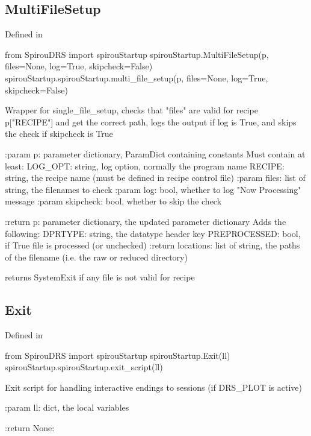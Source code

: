 \noindent\begin{minipage}{\textwidth}
\subsection{MultiFileSetup}

Defined in \spirouStartup{}

\begin{pythonbox}
from SpirouDRS import spirouStartup
spirouStartup.MultiFileSetup(p, files=None, log=True, skipcheck=False)
spirouStartup.spirouStartup.multi_file_setup(p, files=None, log=True, skipcheck=False)
\end{pythonbox}

\begin{pythondocstring}
Wrapper for single_file_setup, checks that "files" are valid for recipe 
p["RECIPE"] and get the correct path, logs the output if log is True, 
and skips the check if skipcheck is True

:param p: parameter dictionary, ParamDict containing constants
    Must contain at least:
        LOG_OPT: string, log option, normally the program name
        RECIPE: string, the recipe name (must be defined in recipe control
                file)
:param files: list of string, the filenames to check
:param log: bool, whether to log "Now Processing" message
:param skipcheck: bool, whether to skip the check

:return p: parameter dictionary, the updated parameter dictionary
        Adds the following:
            DPRTYPE: string, the datatype header key
            PREPROCESSED: bool, if True file is processed (or unchecked)
:return locations: list of string, the paths of the filename 
                   (i.e. the raw or reduced directory)

returns SystemExit if any file is not valid for recipe
\end{pythondocstring}
\end{minipage}



\noindent\begin{minipage}{\textwidth}
\subsection{Exit}

Defined in \spirouStartup{}

\begin{pythonbox}
from SpirouDRS import spirouStartup
spirouStartup.Exit(ll)
spirouStartup.spirouStartup.exit_script(ll)
\end{pythonbox}

\begin{pythondocstring}
Exit script for handling interactive endings to sessions (if DRS_PLOT is
active)

:param ll: dict, the local variables

:return None:
\end{pythondocstring}
\end{minipage}